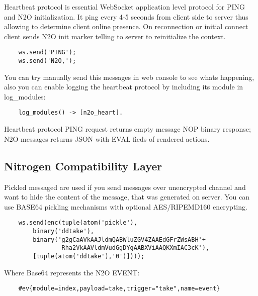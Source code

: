 Heartbeat protocol is essential WebSocket application level protocol for
PING and N2O initialization. It ping every 4-5 seconds from client side to server
thus allowing to determine client online presence. On reconnection or initial connect
client sends N2O init marker telling to server to reinitialize the context.

\vspace{1\baselineskip}
\begin{lstlisting}
    ws.send('PING');
    ws.send('N2O,');
\end{lstlisting}
\vspace{1\baselineskip}

You can try manually send this messages in web console to see whats happening,
also you can enable logging the heartbeat protocol by including its module in log\_modules:

\vspace{1\baselineskip}
\begin{lstlisting}
    log_modules() -> [n2o_heart].
\end{lstlisting}
\vspace{1\baselineskip}

Heartbeat protocol PING request returns empty message NOP binary response;
N2O messages returns JSON with EVAL fieds of rendered actions.

\subsection{Nitrogen Compatibility Layer}

Pickled messaged are used if you send messages over unencrypted
channel and want to hide the content of the message,
that was generated on server. You can use BASE64 pickling mechanisms
with optional AES/RIPEMD160 encrypting.

\vspace{1\baselineskip}
\begin{lstlisting}
    ws.send(enc(tuple(atom('pickle'),
        binary('ddtake'),
        binary('g2gCaAVkAAJldmQABWluZGV4ZAAEdGFrZWsABH'+
                Rha2VkAAVldmVudGgDYgAABXViAAQKXmIAC3cK'),
        [tuple(atom('ddtake'),'0')])));
\end{lstlisting}
\vspace{1\baselineskip}

Where Base64 represents the N2O EVENT:

\vspace{1\baselineskip}
\begin{lstlisting}
    #ev{module=index,payload=take,trigger="take",name=event}
\end{lstlisting}
\vspace{1\baselineskip}

